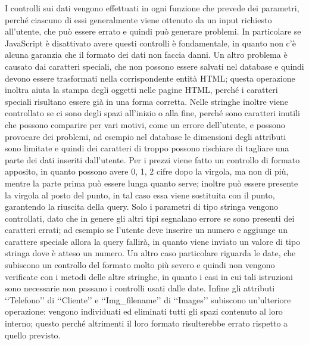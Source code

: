 {{		I controlli sui dati vengono effettuati in ogni funzione che prevede dei parametri, perché ciascuno di essi generalmente viene ottenuto da un input richiesto all'utente, che può essere errato e quindi può generare problemi. In particolare se JavaScript è disattivato avere questi controlli è fondamentale, in quanto non c'è alcuna garanzia che il formato dei dati non faccia danni. Un altro problema è causato dai caratteri speciali, che non possono essere salvati nel database e quindi devono essere trasformati nella corrispondente entità HTML; questa operazione inoltra aiuta la stampa degli oggetti nelle pagine HTML, perché i caratteri speciali risultano essere già in una forma corretta. Nelle stringhe inoltre viene controllato se ci sono degli spazi all'inizio o alla fine, perché sono caratteri inutili che possono comparire per vari motivi, come un errore dell'utente, e possono provocare dei problemi, ad esempio nel database le dimensioni degli attributi sono limitate e quindi dei caratteri di troppo possono rischiare di tagliare una parte dei dati inseriti dall'utente. Per i prezzi viene fatto un controllo di formato apposito, in quanto possono avere 0, 1, 2 cifre dopo la virgola, ma non di più, mentre la parte prima può essere lunga quanto serve; inoltre può essere presente la virgola al posto del punto, in tal caso essa viene sostituita con il punto, garantendo la riuscita della query.
		Solo i parametri di tipo stringa vengono controllati, dato che in genere gli altri tipi segnalano errore se sono presenti dei caratteri errati; ad esempio se l'utente deve inserire un numero e aggiunge un carattere speciale allora la query fallirà, in quanto viene inviato un valore di tipo stringa dove è atteso un numero. Un altro caso particolare riguarda le date, che subiscono un controllo del formato molto più severo e quindi non vengono verificate con i metodi delle altre stringhe, in quanto i casi in cui tali istruzioni sono necessarie non passano i controlli usati dalle date. Infine gli attributi ‘‘Telefono’’ di ‘‘Cliente’’ e ‘‘Img_filename’’ di ‘‘Images’’ subiscono un'ulteriore operazione: vengono individuati ed eliminati tutti gli spazi contenuto al loro interno; questo perché altrimenti il loro formato risulterebbe errato rispetto a quello previsto.
	}
}